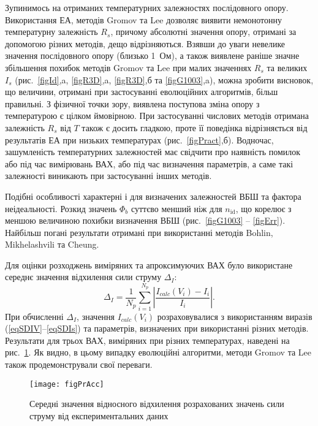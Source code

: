Зупинимось на отриманих температурних залежностях послідовного опору.
Використання ЕА, методів Gromov та Lee дозволяє виявити немонотонну температурну залежність $R_s$, причому абсолютні значення опору, отримані за допомогою різних методів, дещо відрізняються.
Взявши до уваги невелике значення послідовного опору (близько 1~Ом), а також виявлене раніше значне збільшення похибок методів Gromov та Lee при малих значеннях $R_s$ та великих $I_s$ (рис.~\ref{figId},a, \ref{figR3D},a, \ref{figR3D},б та \ref{figG1003},a), можна зробити висновок, що величини, отримані при застосуванні еволюційних алгоритмів, більш правильні.
З фізичної точки зору, виявлена поступова зміна опору з температурою є цілком ймовірною.
При застосуванні числових методів отримана залежність $R_s$ від $T$ також є досить гладкою, проте її поведінка відрізняється від результатів ЕА при низьких температурах (рис.~\ref{figPract},б).
Водночас, зашумленість температурних залежностей має свідчити про наявність помилок або під час вимірювань ВАХ, або під час визначення параметрів, а саме такі залежності виникають при застосуванні інших методів.

Подібні особливості характерні і для визначених залежностей ВБШ та фактора неідеальності.
Розкид значень $\Phi_b$ суттєво менший ніж для $n_\mathrm{id}$, що корелює з меншою величиною похибки визначення ВБШ (рис.~\ref{figG1003} -- \ref{figErr}).
Найбільш погані результати отримані при використанні методів Bohlin, Mikhelashvili та Cheung.

Для оцінки розходжень виміряних та апроксимуючих ВАХ було використане середнє значення відхилення сили струму $\Delta_I$:
 \begin{equation}
 \label{eqMCur}
 \Delta_I=\frac{1}{N_p}\sum_{i=1}^{N_p}\left|\frac{I_{calc}(V_i)-I_i}{I_i}\right|.
 \end{equation}
При обчисленні $\Delta_I$, значення $I_{calc}(V_i)$ розраховувалися з використанням виразів (\ref{eqSDIV}--\ref{eqSDIs}) та параметрів, визначених при використанні різних методів.
Результати для трьох ВАХ, виміряних при різних температурах, наведені на рис.~\ref{figPrAcc}.
Як видно, в цьому випадку еволюційні алгоритми, методи Gromov та Lee також продемонстрували свої переваги.


\begin{figure}
\center
\texttt{[image: figPrAcc]}%
\caption{\label{figPrAcc}
Середні значення відносного відхилення розрахованих значень сили струму від експериментальних даних
}
\end{figure}

